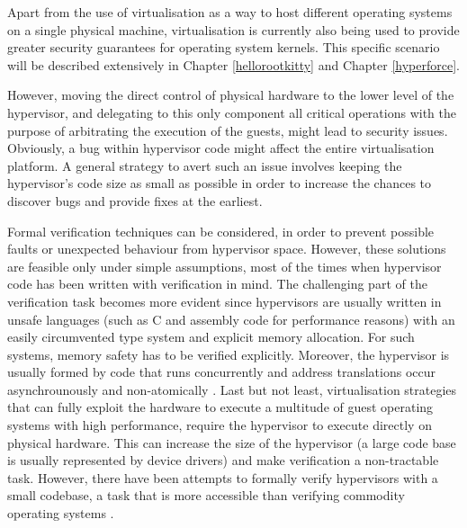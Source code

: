 Apart from the use of virtualisation as a way to host different operating systems on a single physical machine, virtualisation is currently also being used to provide greater security guarantees for operating system kernels.
This specific scenario will be described extensively in Chapter \ref{hellorootkitty} and Chapter \ref{hyperforce}.

However, moving the direct control of physical hardware to the lower level of the hypervisor, and delegating to this only component all critical operations with the purpose of arbitrating the execution of the guests, might lead to security issues. Obviously, a bug within hypervisor code might affect the entire virtualisation platform. 
A general strategy to avert such an issue involves keeping the hypervisor's code size as small as possible in order to increase the chances to discover bugs and provide fixes at the earliest.
 
Formal verification techniques can be considered, in order to prevent possible faults or unexpected behaviour from hypervisor space. However, these solutions are feasible only under simple assumptions, most of the times when hypervisor code has been written with verification in mind. 
The challenging part of the verification task becomes more evident since hypervisors are usually written in unsafe languages (such as C and assembly code for performance reasons) with an easily circumvented type system and explicit memory allocation. For such systems, memory safety has to be verified explicitly. Moreover, the hypervisor is usually formed by code that runs concurrently and address translations occur asynchrounously and non-atomically \cite{formalmethods,verifyhyperv}.  
Last but not least, virtualisation strategies that can fully exploit the hardware to execute a multitude of guest operating systems with high performance, require the hypervisor to execute directly on physical hardware. This can increase the size of the hypervisor (a large code base is usually represented by device drivers) and make verification a non-tractable task. However, there have been attempts to formally verify hypervisors with a small codebase, a task that is more accessible than verifying commodity operating systems \cite{verifyhyperv, formsecxenon}.   

